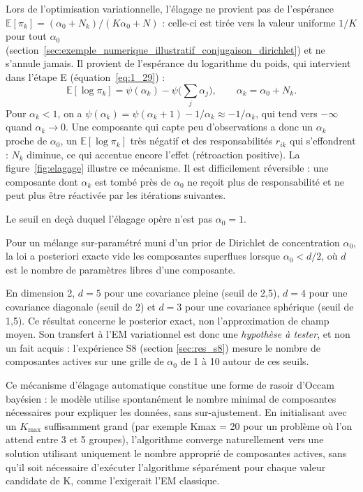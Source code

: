 Lors de l'optimisation variationnelle, l'élagage ne provient pas de l'espérance $\mathbb{E}[\pi_k] = (\alpha_0 + N_k)/(K\alpha_0 + N)$ : celle-ci est tirée vers la valeur uniforme $1/K$ pour tout $\alpha_0$ (section~\ref{sec:exemple_numerique_illustratif_conjugaison_dirichlet}) et ne s'annule jamais. Il provient de l'espérance du logarithme du poids, qui intervient dans l'étape E (équation~\ref{eq:1_29}) :
\begin{equation*}
\mathbb{E}[\log \pi_k] = \psi(\alpha_k) - \psi\Big(\sum_{j}\alpha_j\Big), \qquad \alpha_k = \alpha_0 + N_k .
\end{equation*}
Pour $\alpha_k < 1$, on a $\psi(\alpha_k) = \psi(\alpha_k + 1) - 1/\alpha_k \approx -1/\alpha_k$, qui tend vers $-\infty$ quand $\alpha_k \to 0$. Une composante qui capte peu d'observations a donc un $\alpha_k$ proche de $\alpha_0$, un $\mathbb{E}[\log \pi_k]$ très négatif et des responsabilités $r_{ik}$ qui s'effondrent : $N_k$ diminue, ce qui accentue encore l'effet (rétroaction positive). La figure~\ref{fig:elagage} illustre ce mécanisme. Il est difficilement réversible : une composante dont $\alpha_k$ est tombé près de $\alpha_0$ ne reçoit plus de responsabilité et ne peut plus être réactivée par les itérations suivantes.



Le seuil en deçà duquel l'élagage opère n'est pas $\alpha_0 = 1$.

\begin{theoreme}\label{thm:rousseau}
Pour un mélange sur-paramétré muni d'un prior de Dirichlet de concentration $\alpha_0$, la loi a posteriori exacte vide les composantes superflues lorsque $\alpha_0 < d/2$, où $d$ est le nombre de paramètres libres d'une composante.
\end{theoreme}

En dimension 2, $d = 5$ pour une covariance pleine (seuil de 2,5), $d = 4$ pour une covariance diagonale (seuil de 2) et $d = 3$ pour une covariance sphérique (seuil de 1,5). Ce résultat concerne le posterior exact, non l'approximation de champ moyen. Son transfert à l'EM variationnel est donc une \emph{hypothèse à tester}, et non un fait acquis : l'expérience S8 (section \ref{sec:res_s8}) mesure le nombre de composantes actives sur une grille de $\alpha_0$ de 1 à 10 autour de ces seuils.

Ce mécanisme d'élagage automatique constitue une forme de rasoir d'Occam bayésien : le modèle utilise spontanément le nombre minimal de composantes nécessaires pour expliquer les données, sans sur-ajustement. En initialisant avec un $K_{\max}$ suffisamment grand (par exemple Kmax = 20 pour un problème où l'on attend entre 3 et 5 groupes), l'algorithme converge naturellement vers une solution utilisant uniquement le nombre approprié de composantes actives, sans qu'il soit nécessaire d'exécuter l'algorithme séparément pour chaque valeur candidate de K, comme l'exigerait l'EM classique.

